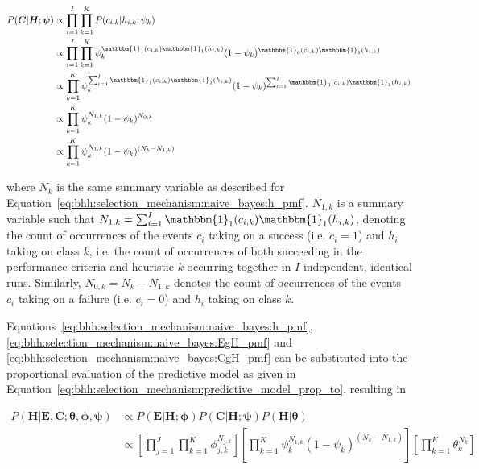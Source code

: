 \begin{equation}
      \label{eq:bhh:selection_mechanism:naive_bayes:CgH_pmf}
      \begin{split}
            P(\boldsymbol{C} \vert \boldsymbol{H}; \boldsymbol{\psi})
            &\propto\prod_{i=1}^{I} \prod_{k=1}^{K} P(c_{i,k} \vert h_{i,k} ; \psi_{k})  \\
            &\propto \prod_{i=1}^{I} \prod_{k=1}^{K} \psi_{k}^{\mathbbm{1}_{1}(c_{i,k})\mathbbm{1}_{1}(h_{i,k})} (1 - \psi_{k})^{\mathbbm{1}_{0}(c_{i,k})\mathbbm{1}_{1}(h_{i,k})}\\
            &\propto \prod_{k=1}^{K} \psi_{k}^{\sum_{i=1}^{I} \mathbbm{1}_{1}(c_{i,k})\mathbbm{1}_{1}(h_{i,k})} (1 - \psi_{k})^{\sum_{i=1}^{I} \mathbbm{1}_{0}(c_{i,k})\mathbbm{1}_{1}(h_{i,k})}\\
            &\propto \prod_{k=1}^{K} \psi_{k}^{N_{1,k}} (1 - \psi_{k})^{N_{0,k}} \\
            &\propto \prod_{k=1}^{K} \psi_{k}^{N_{1,k}} (1 - \psi_{k})^{(N_{k} - N_{1,k})}
      \end{split}
\end{equation}

where $N_{k}$ is the same summary variable as described for Equation~\eqref{eq:bhh:selection_mechanism:naive_bayes:h_pmf}. $N_{1,k}$ is a summary variable such that $N_{1,k} = \sum_{i=1}^{I} \mathbbm{1}_{1}(c_{i,k})\mathbbm{1}_{1}(h_{i,k})$, denoting the count of occurrences of the events $c_{i}$ taking on a success (i.e. $c_{i}=1$) and $h_{i}$ taking on class $k$, i.e. the count of occurrences of both succeeding in the performance criteria and heuristic $k$ occurring together in $I$ independent, identical runs. Similarly, $N_{0,k} = N_{k} - N_{1,k}$ denotes the count of occurrences of the events $c_{i}$ taking on a failure (i.e. $c_{i}=0$) and $h_{i}$ taking on class $k$.

Equations~\eqref{eq:bhh:selection_mechanism:naive_bayes:h_pmf}, \eqref{eq:bhh:selection_mechanism:naive_bayes:EgH_pmf} and \eqref{eq:bhh:selection_mechanism:naive_bayes:CgH_pmf} can be substituted into the proportional evaluation of the predictive model as given in Equation~\eqref{eq:bhh:selection_mechanism:predictive_model_prop_to}, resulting in

\begin{equation}
      \label{eq:bhh:selection_mechanism:naive_bayes:HgEC_pmf}
      \begin{split}
            P(\boldsymbol{H} \vert \boldsymbol{E}, \boldsymbol{C};  \boldsymbol{\theta}, \boldsymbol{\phi}, \boldsymbol{\psi})
            &\propto P(\boldsymbol{E} \vert \boldsymbol{H};  \boldsymbol{\phi})  P(\boldsymbol{C} \vert \boldsymbol{H}; \boldsymbol{\psi}) P(\boldsymbol{H} \vert \boldsymbol{\theta})  \\
            &\propto \left[ \prod_{j=1}^{J} \prod_{k=1}^{K} \phi_{j,k}^{N_{j,k}} \right] \left[ \prod_{k=1}^{K} \psi_{k}^{N_{1,k}} (1 - \psi_{k})^{(N_{k} - N_{1,k})} \right] \left[ \prod_{k=1}^{K} \theta_{k}^{N_{k}} \right]
      \end{split}
\end{equation}


